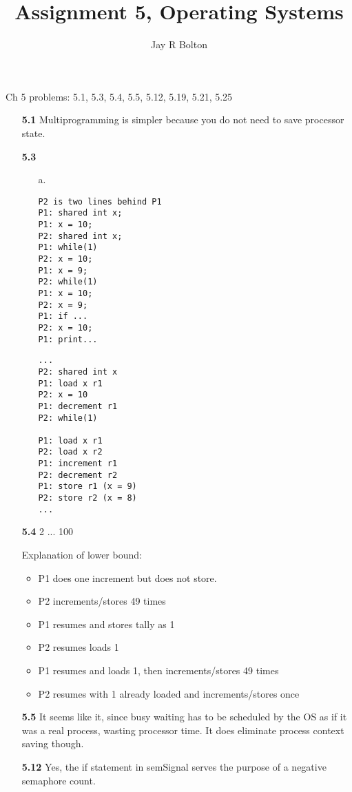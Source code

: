 \documentclass{article}
\title{Assignment 5, Operating Systems}
\author{Jay R Bolton}
\begin{document}
\maketitle

Ch 5 problems: 5.1, 5.3, 5.4, 5.5, 5.12, 5.19, 5.21, 5.25

\begin{enumerate}

\item[\textbf{5.1}]
Multiprogramming is simpler because you do not need to save processor state.

\item[\textbf{5.3}]
\begin{enumerate}
\item[a.]
\begin{verbatim}
P2 is two lines behind P1
P1: shared int x;
P1: x = 10;
P2: shared int x;
P1: while(1)
P2: x = 10;
P1: x = 9;
P2: while(1)
P1: x = 10;
P2: x = 9;
P1: if ...
P2: x = 10;
P1: print...
\end{verbatim}
\begin{verbatim}
...
P2: shared int x
P1: load x r1
P2: x = 10
P1: decrement r1
P2: while(1)

P1: load x r1
P2: load x r2
P1: increment r1
P2: decrement r2
P1: store r1 (x = 9)
P2: store r2 (x = 8)
...
\end{verbatim}
\end{enumerate}

\item[\textbf{5.4}]
2 ... 100

Explanation of lower bound:
\begin{itemize}
\item
P1 does one increment but does not store.
\item
P2 increments/stores 49 times
\item
P1 resumes and stores tally as 1
\item
P2 resumes loads 1
\item
P1 resumes and loads 1, then increments/stores 49 times
\item
P2 resumes with 1 already loaded and increments/stores once
\end{itemize}

\item[\textbf{5.5}]
It seems like it, since busy waiting has to be scheduled by the OS as if it was
a real process, wasting processor time. It does eliminate process context
saving though.

\item[\textbf{5.12}]
Yes, the if statement in semSignal serves the purpose of a negative semaphore
count.


\end{enumerate}
\end{document}
